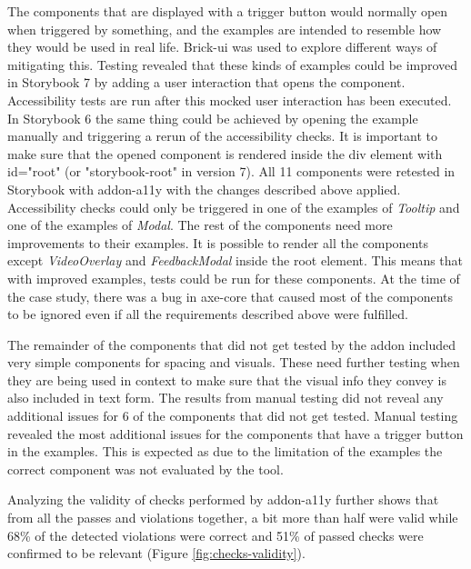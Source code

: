 \documentclass{master_thesis}
\begin{document}
The components that are displayed with a trigger button would normally open when triggered by something, and the examples are intended to resemble how they would be used in real life. Brick-ui was used to explore different ways of mitigating this. Testing revealed that these kinds of examples could be improved in Storybook 7 by adding a user interaction that opens the component. Accessibility tests are run after this mocked user interaction has been executed. In Storybook 6 the same thing could be achieved by opening the example manually and triggering a rerun of the accessibility checks. It is important to make sure that the opened component is rendered inside the div element with id="root" (or "storybook-root" in version 7). All 11 components were retested in Storybook with addon-a11y with the changes described above applied. Accessibility checks could only be triggered in one of the examples of \textit{Tooltip} and one of the examples of \textit{Modal}. The rest of the components need more improvements to their examples. It is possible to render all the components except \textit{VideoOverlay} and \textit{FeedbackModal} inside the root element. This means that with improved examples, tests could be run for these components. At the time of the case study, there was a bug in axe-core that caused most of the components to be ignored even if all the requirements described above were fulfilled.

The remainder of the components that did not get tested by the addon included very simple components for spacing and visuals. These need further testing when they are being used in context to make sure that the visual info they convey is also included in text form. The results from manual testing did not reveal any additional issues for 6 of the components that did not get tested. Manual testing revealed the most additional issues for the components that have a trigger button in the examples. This is expected as due to the limitation of the examples the correct component was not evaluated by the tool.

Analyzing the validity of checks performed by addon-a11y further shows that from all the passes and violations together, a bit more than half were valid while 68\% of the detected violations were correct and 51\% of passed checks were confirmed to be relevant (Figure \ref{fig:checks-validity}).
\end{document}
